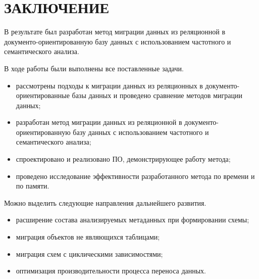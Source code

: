 \chapter*{ЗАКЛЮЧЕНИЕ}

В результате был разработан метод миграции данных из реляционной в
документо-ориентированную базу данных с
использованием частотного и семантического
анализа.

В ходе работы были выполнены все поставленные задачи.
\begin{itemize}[label=---]
    \item рассмотрены подходы к миграции данных из реляционных в документо-ориентированные
    базы данных и проведено сравнение методов миграции данных;
    \item разработан метод миграции данных из реляционной в документо-ориентированную базу данных с
    использованием частотного и семантического анализа;
    \item спроектировано и реализовано ПО, демонстрирующее работу метода;
    \item проведено исследование эффективности разработанного метода по времени и по памяти.
\end{itemize}

Можно выделить следующие направления дальнейшего развития.
\begin{itemize}[label=---]
    \item расширение состава анализируемых метаданных при формировании схемы;
    \item миграция объектов не являющихся таблицами;
    \item миграция схем с циклическими зависимостями;
    \item оптимизация производительности процесса переноса данных.
\end{itemize}


